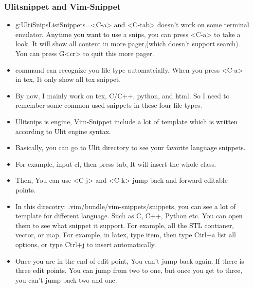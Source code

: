 \documentclass[paper=8.5in:11in, twoside, 12pt, pagesize=pdftex]{book}
\begin{document}
									\subsubsection{Ulitsnippet and Vim-Snippet}
									\begin{itemize}
										\item g:UltiSnipsListSnippets=<C-a> and <C-tab> doesn't work on some terminal emulator. Anytime you want to use a snips, you can press <C-a> to take a look. It will show all content in more pager,(which doesn't support search). You can press G<cr> to quit this more pager.
										
										\item <C-a> command can recognize you file type automatcially. When you press <C-a> in tex, It only show all tex snippet. 
										
										\item By now, I mainly work on tex, C/C++, python, and html. So I need to remember some common used snippets in these four file types. 
										
										\item Ulitsnips is engine, Vim-Snippet include a lot of template which is written according to Ulit engine syntax. 
										
										\item Basically, you can go to Ulit directory to see your favorite language snippets. 
										
										\item For example, input cl, then press tab, It will insert the whole class. 
										
										\item Then, You can use <C-j> and <C-k> jump back and forward editable points. 
										
										\item In this direcotry: .vim/bundle/vim-snippets/snippets, you can see a lot of template for different language. Such as C, C++, Python etc. You can open them to see what snippet it support. For example, all the STL contianer, vector, or map. For example, in latex, type item, then type Ctrl+a list all options, or type Ctrl+j to insert automatically. 
										
										\item Once you are in the end of edit point, You can't jump back again. If there is three edit points, You can jump from two to one, but once you get to three, you can't jump back two and one. 
										

\end{itemize}
\end{document}
